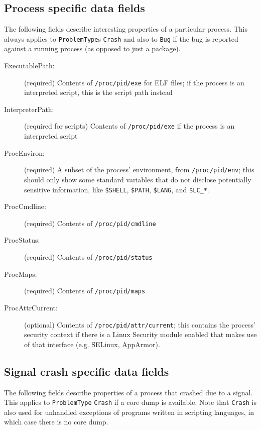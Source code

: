 \documentclass[DIV12,halfparskip]{scrartcl}
\begin{document}
\subsection{Process specific data fields}

The following fields describe interesting properties of a particular process.
This always applies to \verb!ProblemType!s \verb!Crash! and also to \verb!Bug!
if the bug is reported against a running process (as opposed to just a
package).

\begin{description}
    \item [ExecutablePath:] (required) Contents of \verb!/proc/pid/exe! for ELF
    files; if the process is an interpreted script, this is the script path instead

    \item [InterpreterPath:] (required for scripts) Contents of
    \verb!/proc/pid/exe! if the process is an interpreted script

    \item [ProcEnviron:] (required) A subset of the process' environment, from
    \verb!/proc/pid/env!; this should only show some standard variables that do
    not disclose potentially sensitive information, like \verb!$SHELL!,
    \verb!$PATH!, \verb!$LANG!, and \verb!$LC_*!.

    \item [ProcCmdline:] (required) Contents of \verb!/proc/pid/cmdline!

    \item [ProcStatus:] (required) Contents of \verb!/proc/pid/status!

    \item [ProcMaps:] (required) Contents of \verb!/proc/pid/maps!

    \item [ProcAttrCurrent:] (optional) Contents of
    \verb!/proc/pid/attr/current!; this contains the process' security
    context if there is a Linux Security module enabled that makes use
    of that interface (e.g. SELinux, AppArmor).

\end{description}

\subsection{Signal crash specific data fields}

The following fields describe properties of a process that crashed due to a
signal. This applies to \verb!ProblemType! \verb!Crash! if a core dump is
available. Note that \verb!Crash! is also used for unhandled exceptions of
programs written in scripting languages, in which case there is no core dump.
\end{document}
